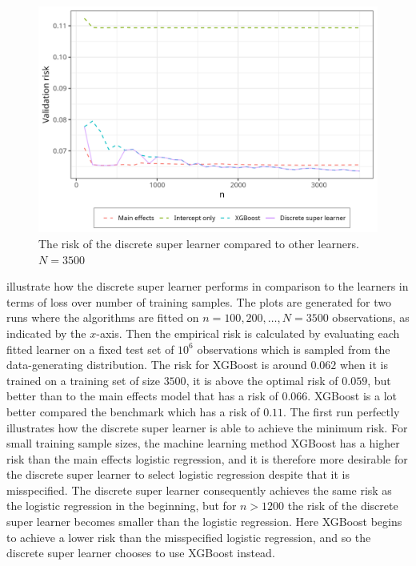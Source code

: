\documentclass[./main.tex]{subfiles}
\begin{document}
\begin{figure}[H]
    \centering
    \includegraphics[width=\textwidth]{figures/dsl_loss_jumps.png}
    \caption{The risk of the discrete super learner compared to other learners. $ N = 3500 $}
    \label{fig:loss_jumps}
\end{figure}
 illustrate how the discrete super learner performs in comparison to the learners in terms of loss over number of training samples. The plots are generated for two runs where the algorithms are fitted on $ n = 100, 200, \dots , N = 3500 $ observations, as indicated by the $ x $-axis. Then the empirical risk is calculated by evaluating each fitted learner on a fixed test set of $ 10^{6} $ observations which is sampled from the data-generating distribution.  
The risk for XGBoost is around $ 0.062 $ when it is trained on a training set of size $ 3500 $, it is above the optimal risk of $ 0.059 $, but better than to the main effects model that has a risk of $ 0.066 $. XGBoost is a lot better compared the benchmark which has a risk of $ 0.11 $. 
The first run perfectly illustrates how the discrete super learner is able to achieve the minimum risk. For small training sample sizes, the machine learning method XGBoost has a higher risk than the main effects logistic regression, and it is therefore more desirable for the discrete super learner to select logistic regression despite that it is misspecified. The discrete super learner consequently achieves the same risk as the logistic regression in the beginning, but for $ n > 1200 $ the risk of the discrete super learner becomes smaller than the logistic regression. Here XGBoost begins to achieve a lower risk than the misspecified logistic regression, and so the discrete super learner chooses to use XGBoost instead. 
\end{document}
